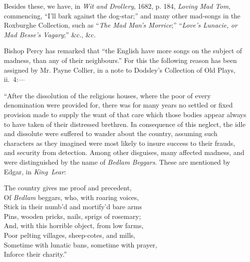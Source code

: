 Besides these, we have, in \textit{Wit and Drollery}, 1682, p. 184, \textit{Loving Mad Tom},
commencing, “I’ll bark against the dog-star;” and many other mad-songs in the
Roxburghe Collection, such as “\textit{The Mad Man’s Morrice};” “\textit{Love’s Lunacie, or
Mad Besse’s Vagary};” \&c., \&c.

Bishop Percy has remarked that “the English have more songs on the subject
of madness, than any of their neighbours.” For this the following reason has
been assigned by Mr. Payne Collier, in a note to Dodsley’s Collection of Old
Plays, ii.~4:—

“After the dissolution of the religious houses, where the poor of every denomination
were provided for, there was for many years no settled or fixed provision made to
supply the want of that care which those bodies appear always to have taken of their
distressed brethren. In consequence of this neglect, the idle and dissolute were
suffered to wander about the country, assuming such characters as they imagined were
most likely to insure success to their frauds, and security from detection. Among
other disguises, many affected madness, and were distinguished by the name of
\textit{Bedlam Beggars}. These are mentioned by Edgar, in \textit{King~Lear}:
\settowidth{\versewidth}{The country gives me proof and precedent,}
\begin{scverse}The country gives me proof and precedent,\\
Of \textit{Bedlam} beggars, who, with roaring voices,\\
Stick in their numb’d and mortify’d bare arms\\
Pins, wooden pricks, nails, sprigs of rosemary;\\
And, with this horrible object, from low farms,\\
Poor pelting villages, sheep-cotes, and mills,\\
Sometime with lunatic bans, sometime with prayer,\\
Inforce their charity.”
\end{scverse}


